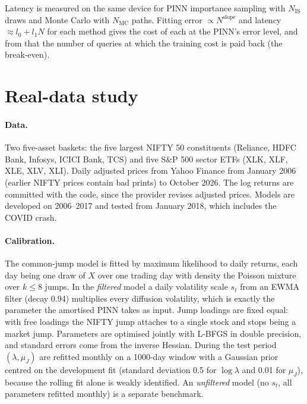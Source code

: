 Latency is measured on the same device for PINN importance sampling with $N_{\mathrm{IS}}$ draws and Monte
Carlo with $N_{\mathrm{MC}}$ paths. Fitting error $\propto N^{\text{slope}}$ and latency $\approx l_0 + l_1 N$
for each method gives the cost of each at the PINN's error level, and from that the number of queries at which
the training cost is paid back (the break-even).

\section{Real-data study}
\label{sec:met-real}

\paragraph{Data.} Two five-asset baskets: the five largest NIFTY 50 constituents (Reliance, HDFC Bank, Infosys,
ICICI Bank, TCS) and five S\&P 500 sector ETFs (XLK, XLF, XLE, XLV, XLI). Daily adjusted prices from Yahoo
Finance from January 2006 (earlier NIFTY prices contain bad prints) to October 2026. The log returns are
committed with the code, since the provider revises adjusted prices. Models are developed on 2006--2017 and
tested from January 2018, which includes the COVID crash.

\paragraph{Calibration.} The common-jump model is fitted by maximum likelihood to daily returns, each day being
one draw of $X$ over one trading day with density the Poisson mixture over $k \le 8$ jumps. In the
\emph{filtered} model a daily volatility scale $s_t$ from an EWMA filter (decay 0.94) multiplies every diffusion
volatility, which is exactly the parameter the amortised PINN takes as input. Jump loadings are fixed equal: with
free loadings the NIFTY jump attaches to a single stock and stops being a market jump. Parameters are optimised
jointly with L-BFGS in double precision, and standard errors come from the inverse Hessian. During the test
period $(\lambda, \mu_J)$ are refitted monthly on a 1000-day window with a Gaussian prior centred on the
development fit (standard deviation 0.5 for $\log\lambda$ and 0.01 for $\mu_J$), because the rolling fit alone is
weakly identified. An \emph{unfiltered} model (no $s_t$, all parameters refitted monthly) is a separate
benchmark.


